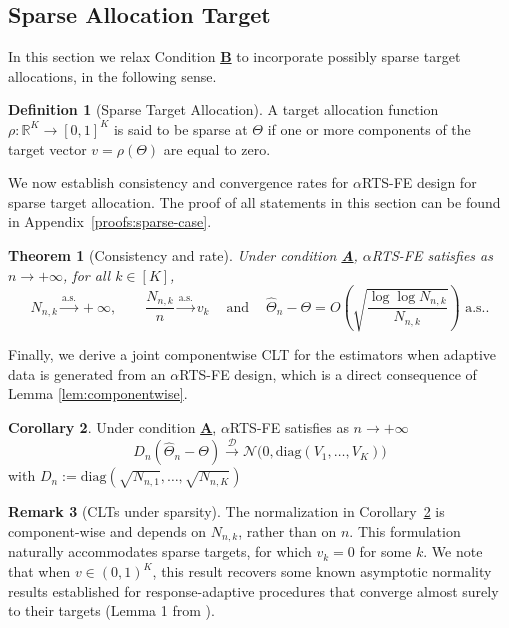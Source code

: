 \documentclass[11pt]{article}
\theoremstyle{plain}
\newtheorem{theorem}{Theorem}[section]
\theoremstyle{definition}
\newtheorem{definition}{Definition}[section]
\newtheorem{corollary}[theorem]{Corollary}
\newtheorem{remark}[theorem]{Remark}
\begin{document}
\subsection{Sparse Allocation Target} 

In this section we relax Condition \hyperlink{CB}{\textbf{B}} to incorporate possibly sparse target allocations, in the following sense.

\begin{definition}[Sparse Target Allocation]
	A target allocation function \(\rho: \mathbb{R}^K \to [0,1]^K\) is said to be sparse at \(\Theta\) if one or more components of the target vector \(v = \rho(\Theta)\) are equal to zero.
\end{definition}

We now establish consistency and convergence rates for \(\alpha\)RTS-FE design for sparse target allocation. The proof of all statements in this section can be found in Appendix~\ref{proofs:sparse-case}.


\begin{theorem}[Consistency and rate]\label{thm:sparse-rate}
	Under condition \hyperlink{CA}{\textbf{A}}, \(\alpha\)RTS-FE satisfies as \(n \to +\infty\), for all $k \in [K]$,
	\[
	N_{n,k}\xrightarrow{\text{a.s.}}+\infty,\qquad
	\frac{N_{n,k}}{n}\xrightarrow{\text{a.s.}}v_k \ \ \ \
	\text{ and } \ \ \ \ \hat\Theta_n-\Theta=O\!\left(\sqrt{\frac{\log\log N_{n,k}}{N_{n,k}}}\right)\text{ a.s.}.
	\]
\end{theorem}

Finally, we derive a joint componentwise CLT for the estimators when adaptive data is generated from an \(\alpha\)RTS-FE design, which is a direct consequence of Lemma \ref{lem:componentwise}.

\begin{corollary}\label{corr:componentwise}
		Under condition \hyperlink{CA}{\textbf{A}}, \(\alpha\)RTS-FE satisfies as \(n \to +\infty\)
		\[
		D_n(\hat\Theta_n-\Theta)\xrightarrow{\mathcal{D}}
		\mathcal N\!\big(0,\mathrm{diag}\left(V_1,\dots,V_K\right)\big)
		\]
		with $D_n:=\mathrm{diag}(\sqrt{N_{n,1}},\dots,\sqrt{N_{n,K}})$
	\end{corollary}
	
\begin{remark}[CLTs under sparsity]\label{cor:sparse-clt}
		The normalization in Corollary~\ref{corr:componentwise} is component-wise and depends on \(N_{n,k}\), rather than on \(n\). This formulation naturally accommodates sparse targets, for which
		\(v_k = 0\) for some $k$. We note that when \(v \in (0, 1)^K\), this result recovers some known asymptotic normality results established for response-adaptive procedures that converge almost surely to their targets (Lemma 1 from  \cite{hu2006asymptotically}).
	\end{remark}
\end{document}

